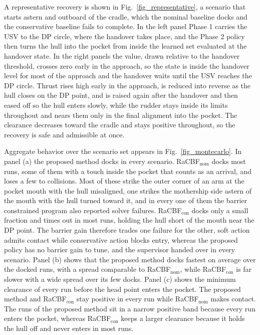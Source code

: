 \documentclass[5p,times,authoryear]{elsarticle}
\begin{document}
A representative recovery is shown in Fig.~\ref{fig_representative}, a scenario that starts astern and outboard of the cradle, which the nominal baseline docks and the conservative baseline fails to complete. In the left panel Phase 1 carries the USV to the DP circle, where the handover takes place, and the Phase 2 policy then turns the hull into the pocket from inside the learned set evaluated at the handover state. In the right panels the value, drawn relative to the handover threshold, crosses zero early in the approach, so the state is inside the handover level for most of the approach and the handover waits until the USV reaches the DP circle. Thrust rises high early in the approach, is reduced into reverse as the hull closes on the DP point, and is raised again after the handover and then eased off so the hull enters slowly, while the rudder stays inside its limits throughout and nears them only in the final alignment into the pocket. The clearance decreases toward the cradle and stays positive throughout, so the recovery is safe and admissible at once.

Aggregate behavior over the scenario set appears in Fig.~\ref{fig_montecarlo}. In panel (a) the proposed method docks in every scenario. RaCBF$_{\mathrm{nom}}$ docks most runs, some of them with a touch inside the pocket that counts as an arrival, and loses a few to collisions. Most of these strike the outer corner of an arm at the pocket mouth with the hull misaligned, one strikes the mothership side astern of the mouth with the hull turned toward it, and in every one of them the barrier constrained program also reported solver failures. RaCBF$_{\mathrm{con}}$ docks only a small fraction and times out in most runs, holding the hull short of the mouth near the DP point. The barrier gain therefore trades one failure for the other, soft action admits contact while conservative action blocks entry, whereas the proposed policy has no barrier gain to tune, and the supervisor handed over in every scenario. Panel (b) shows that the proposed method docks fastest on average over the docked runs, with a spread comparable to RaCBF$_{\mathrm{nom}}$, while RaCBF$_{\mathrm{con}}$ is far slower with a wide spread over its few docks. Panel (c) shows the minimum clearance of every run before the head point enters the pocket. The proposed method and RaCBF$_{\mathrm{con}}$ stay positive in every run while RaCBF$_{\mathrm{nom}}$ makes contact. The runs of the proposed method sit in a narrow positive band because every run enters the pocket, whereas RaCBF$_{\mathrm{con}}$ keeps a larger clearance because it holds the hull off and never enters in most runs.
\end{document}
